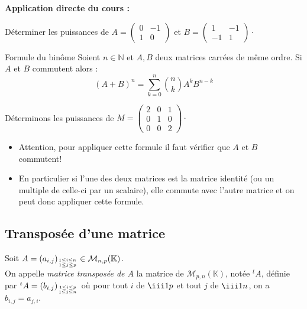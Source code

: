 \documentclass[french,11pt,twoside]{VcCours}
\newenvironment{ApplicationDirecte}{\textbf{Application directe du cours :}

}{}
\begin{document}
\begin{ApplicationDirecte} Déterminer les puissances de $A = \begin{pmatrix}0&-1\\1&0\end{pmatrix}$ et $B=\begin{pmatrix} 1&-1\\-1&1\end{pmatrix}\cdot$
\end{ApplicationDirecte}

\begin{Theoreme}{Formule du binôme}
Soient $n\in \mathbb{N}$ et $A,B$ deux matrices carrées de même ordre. Si $A$ et $B$ commutent alors :
\[ (A+B)^n = \sum_{k=0}^n \binom{n}{k} A^k B^{n-k} \]
\end{Theoreme}

\begin{Exemple} Déterminons les puissances de $M = \begin{pmatrix}
2 & 0 & 1 \\
0 & 1 & 0 \\
0 & 0 & 2
\end{pmatrix}\cdot$

\newpage
\vspace*{10cm}
\end{Exemple}

\begin{Remarques}{}
\begin{itemize}
\item Attention, pour appliquer cette formule il faut vérifier que $A$ et $B$ commutent!
\item En particulier si l'une des deux matrices est la matrice identité (ou un multiple de celle-ci par un scalaire), elle commute avec l'autre matrice et on peut donc appliquer cette formule.
\end{itemize}
\end{Remarques}{}

\subsection{Transposée d'une matrice}
\begin{Definition}{}
 
Soit $A=(a_{i,j})_{{1 \leq i \leq n}\atop{1 \leq j \leq p}} \in 
\mathcal{M}_{n,p}(\mathbb{K})$.\\


On appelle \emph{matrice transposée de $A$} la matrice de 
$\mathcal{M}_{p,n}(\mathbb{K})$, notée $^tA$, définie par 
\linebreak $^tA=(b_{i,j})_{{1 \leq i \leq p}\atop{1 \leq j \leq n}}$ 
où pour tout  $i$ de $\iii1p$ et tout $j$ de $\iii1n$, on a $b_{i,j}= a_{j,i}.$
\end{Definition}
\end{document}
